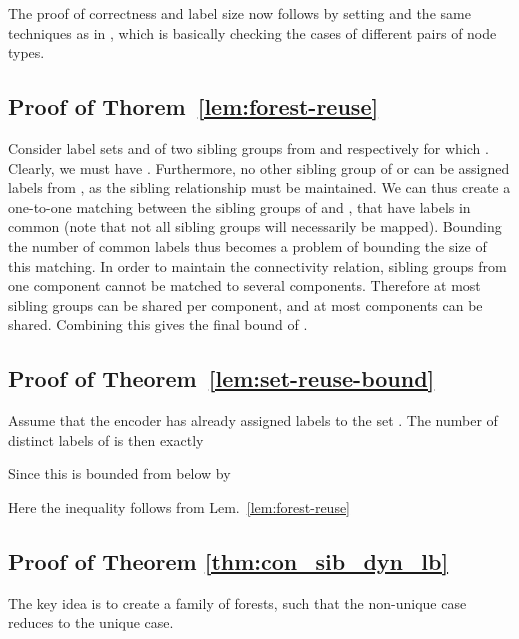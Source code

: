 \documentclass{llncs}
\begin{document}
The proof of correctness and label size now follows by setting  and the same techniques as in \cite{Alstrup02,Alstrup05}, which is
basically checking the cases of different pairs of node types.

\subsection{Proof of Thorem~\ref{lem:forest-reuse} }  \label{proof:forest-reuse}
    Consider label sets  and  of two sibling groups from  and
     respectively for which . Clearly, we must have
    . Furthermore, no
    other   sibling group of  or  can be assigned  labels from
    , as the sibling relationship must be maintained. We can thus
    create a one-to-one matching between the sibling groups of  and
    ,
    that have labels in common (note that not all sibling groups will
    necessarily be mapped). Bounding the number of common labels thus becomes a
    problem of bounding the size of this matching.
    In order to  maintain the connectivity relation, sibling groups from one component cannot be matched to several  components. Therefore at most 
    sibling groups can be shared per component, and at most  components
    can be shared. Combining this gives the final bound of
    .


\subsection{Proof of Theorem~\ref{lem:set-reuse-bound} } \label{proof:set-reuse-bound}
    Assume that the encoder has already assigned labels to the set .
    The number of distinct labels of  is then exactly
    
    Since  this is bounded from below by
    
    Here the inequality follows from Lem.~\ref{lem:forest-reuse}
    
\subsection{Proof of Theorem
\ref{thm:con_sib_dyn_lb}}\label{proof:con_sib_dyn_lb}
The key idea is to create a family of forests, such that the non-unique case reduces to the unique case.
\end{document}

